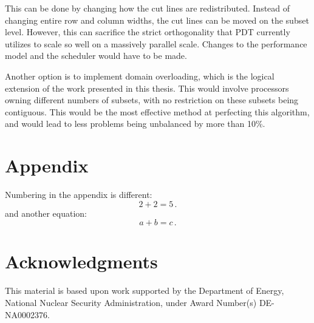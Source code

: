\documentclass{anstrans}
\begin{document}
This can be done by changing how the cut lines are redistributed. Instead of changing entire row and column widths, the cut lines can be moved on the subset level. However, this can sacrifice the strict orthogonality that PDT currently utilizes to scale so well on a massively parallel scale. Changes to the performance model and the scheduler would have to be made.

Another option is to implement domain overloading, which is the logical extension of the work presented in this thesis. This would involve processors owning different numbers of subsets, with no restriction on these subsets being contiguous. This would be the most effective method at perfecting this algorithm, and would lead to less problems being unbalanced by more than 10\%.

\appendix
\section{Appendix}

Numbering in the appendix is different:
\begin{equation} \label{eq:appendix}
  2 + 2 = 5\,.
\end{equation}
and another equation:
\begin{equation} \label{eq:appendix2}
  a + b = c\,.
\end{equation}

\section{Acknowledgments}
This material is based upon work supported by the Department of Energy, National Nuclear Security Administration, under Award Number(s) DE-NA0002376.


\end{document}
